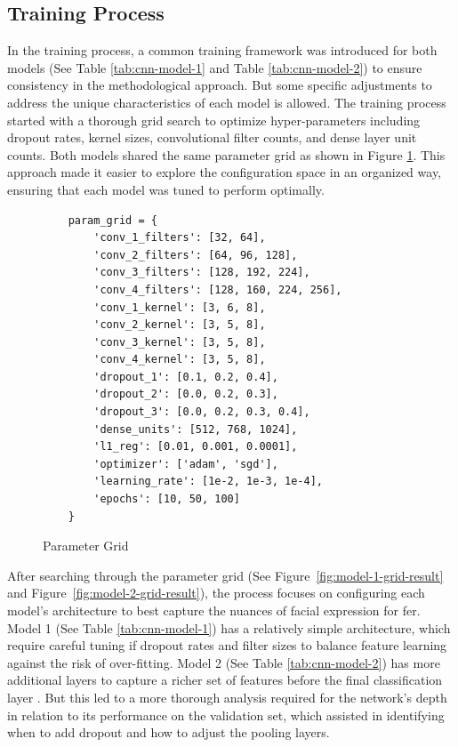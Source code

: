 \subsection{Training Process}
In the training process, a common training framework was introduced for both models (See Table \ref{tab:cnn-model-1} and Table \ref{tab:cnn-model-2}) to ensure consistency in the methodological approach.
But some specific adjustments to address the unique characteristics of each model is allowed.
The training process started with a thorough grid search to optimize hyper-parameters including dropout rates, kernel sizes, convolutional filter counts, and dense layer unit counts.
Both models shared the same parameter grid as shown in Figure \ref{fig:param_grid}.
This approach made it easier to explore the configuration space in an organized way, ensuring that each model was tuned to perform optimally.
\begin{figure}[H] 
    \centering
\begin{verbatim}
    param_grid = {
        'conv_1_filters': [32, 64],
        'conv_2_filters': [64, 96, 128],
        'conv_3_filters': [128, 192, 224],
        'conv_4_filters': [128, 160, 224, 256],
        'conv_1_kernel': [3, 6, 8],
        'conv_2_kernel': [3, 5, 8],
        'conv_3_kernel': [3, 5, 8],
        'conv_4_kernel': [3, 5, 8],
        'dropout_1': [0.1, 0.2, 0.4],
        'dropout_2': [0.0, 0.2, 0.3],
        'dropout_3': [0.0, 0.2, 0.3, 0.4],
        'dense_units': [512, 768, 1024],
        'l1_reg': [0.01, 0.001, 0.0001],
        'optimizer': ['adam', 'sgd'],
        'learning_rate': [1e-2, 1e-3, 1e-4], 
        'epochs': [10, 50, 100]
    }
\end{verbatim}
    \caption{Parameter Grid}
    \label{fig:param_grid}
\end{figure}
\indent After searching through the parameter grid (See Figure~\ref{fig:model-1-grid-result} and Figure~\ref{fig:model-2-grid-result}), the process focuses on configuring each model's architecture to best capture the nuances of facial expression for \gls{fer}.
Model 1 (See Table \ref{tab:cnn-model-1}) has a relatively simple architecture, which require careful tuning if dropout rates and filter sizes to balance feature learning against the risk of over-fitting.
Model 2 (See Table \ref{tab:cnn-model-2}) has more additional layers to capture a richer set of features before the final classification layer . 
But this led to a more thorough analysis required for the network's depth in relation to its performance on the validation set, which assisted in identifying when to add dropout and how to adjust the pooling layers.  
